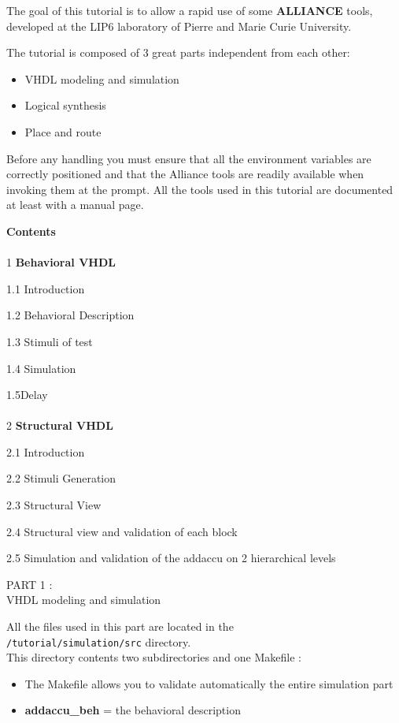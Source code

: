 \documentclass[12pt]{article}
\begin{document}
\newpage
\large{ The goal of this tutorial is to allow a rapid use of some { \bf ALLIANCE } tools, developed at the LIP6 laboratory of Pierre and Marie Curie University.

The tutorial is composed of 3 great parts independent from each other:

\begin{itemize}\itemsep=-.8ex
\item {VHDL modeling and simulation}
\item {Logical synthesis}
\item {Place and route}
\end{itemize}

Before any handling you must ensure that all the environment variables are
correctly positioned and that the Alliance
tools are readily available when invoking them at the prompt. All
the tools used in this tutorial are documented at least with a
manual page.

\newpage
{\bf Contents}\\
\\
{1} {\bf Behavioral VHDL}

{1.1} Introduction

{1.2} Behavioral Description

{1.3} Stimuli of test

{1.4} Simulation

{1.5}Delay\\
\\
{2} {\bf Structural VHDL}

{2.1} Introduction

{2.2} Stimuli Generation

{2.3} Structural View

{2.4} Structural view and validation of each block

{2.5} Simulation and validation of the addaccu on 2 hierarchical levels

\newpage
        {\huge
        PART 1 :\\ }
        \vspace{1cm}
        {\huge
        VHDL modeling and simulation
        }

All the files used in this part are located in the \\ 
\texttt{/tutorial/simulation/src} directory.\\
This directory contents two subdirectories and one Makefile : 
\begin{itemize}
\item The Makefile allows you to validate automatically the entire simulation part
\item {\bf addaccu\_beh} = the behavioral description


\end{itemize}}
\end{document}
